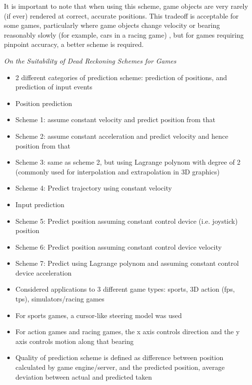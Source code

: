 \documentclass[conference]{IEEEtran}
\begin{document}
	It is important to note that when using this scheme, game objects are very rarely (if ever) rendered at correct, accurate positions. This tradeoff is acceptable for some games, particularly where game objects change velocity or bearing reasonably slowly (for example, cars in a racing game) \cite{pantel2002suitability}, but for games requiring pinpoint accuracy, a better scheme is required.


	\emph{On the Suitability of Dead Reckoning Schemes for Games}

	\begin{itemize}
		\item 2 different categories of prediction scheme: prediction of positions, and prediction of input events
		\item Position prediction
		\item Scheme 1: assume constant velocity and predict position from that
		\item Scheme 2: assume constant acceleration and predict velocity and hence position from that
		\item Scheme 3: same as scheme 2, but using Lagrange polynom with degree of 2 (commonly used for interpolation and extrapolation in 3D graphics)
		\item Scheme 4: Predict trajectory using constant velocity
		\item Input prediction
		\item Scheme 5: Predict position assuming constant control device (i.e. joystick) position
		\item Scheme 6: Predict position assuming constant control device velocity
		\item Scheme 7: Predict using Lagrange polynom and assuming constant control device acceleration
		\item Considered applications to 3 different game types: sports, 3D action (fps, tps), simulators/racing games
		\item For sports games, a cursor-like steering model was used
		\item For action games and racing games, the x axis controls direction and the y axis controls motion along that bearing
		\item Quality of prediction scheme is defined as difference between position calculated by game engine/server, and the predicted position, average deviation between actual and predicted taken

\end{itemize}
\end{document}
